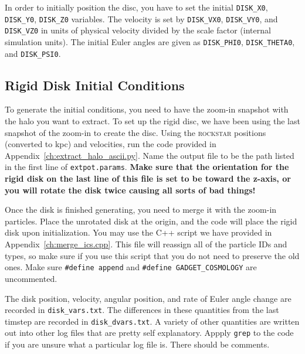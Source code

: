 In order to initially position the disc, you have to set the initial \texttt{DISK\_X0}, \texttt{DISK\_Y0}, \texttt{DISK\_Z0} variables. The velocity is set by \texttt{DISK\_VX0}, \texttt{DISK\_VY0}, and \texttt{DISK\_VZ0} in units of physical velocity divided by the scale factor (internal simulation units). The initial Euler angles are given as \texttt{DISK\_PHI0}, \texttt{DISK\_THETA0}, and \texttt{DISK\_PSI0}. 

\subsection{Rigid Disk Initial Conditions}

To generate the initial conditions, you need to have the zoom-in snapshot with the halo you want to extract. To set up the rigid disc, we have been using the last snapshot of the zoom-in to create the disc. Using the \textsc{rockstar} positions (converted to kpc) and velocities, run the code provided in Appendix~\ref{ch:extract_halo_ascii.py}. Name the output file to be the path listed in the first line of \texttt{extpot.params}. \textbf{Make sure that the orientation for the rigid disk on the last line of this file is set to be toward the z-axis, or you will rotate the disk twice causing all sorts of bad things!}

Once the disk is finished generating, you need to merge it with the zoom-in particles. Place the unrotated disk at the origin, and the code will place the rigid disk upon initialization. You may use the C++ script we have provided in Appendix~\ref{ch:merge_ics.cpp}. This file will reassign all of the particle IDs and types, so make sure if you use this script that you do not need to preserve the old ones. Make sure \texttt{\#define append} and \texttt{\#define GADGET\_COSMOLOGY} are uncommented.

The disk position, velocity, angular position, and rate of Euler angle change are recorded in \texttt{disk\_vars.txt}. The differences in these quantities from the last timstep are recorded in \texttt{disk\_dvars.txt}. A variety of other quantities are written out into other log files that are pretty self explanatory. Appply \texttt{grep} to the code if you are unsure what a particular log file is. There should be comments.



